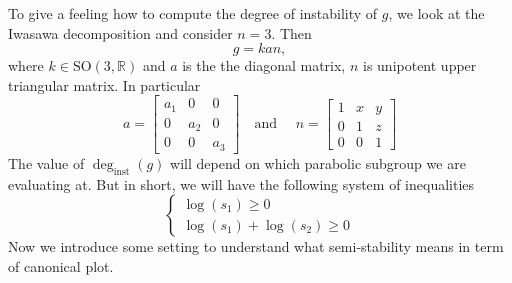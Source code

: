 \documentclass[12pt]{article} %
\begin{document}
    To give a feeling how to compute the degree of instability of $g$, we look at the Iwasawa decomposition and consider $n=3$.
    Then 
    \[g = kan,\]
    where $k \in \text{SO}(3,\mathbb{R})$ and $a$ is the the diagonal matrix, $n$ is unipotent upper triangular matrix. In particular
    \[a = \begin{bmatrix}
        a_1 & 0 & 0\\
        0 & a_2 & 0\\
        0 & 0 & a_3
    \end{bmatrix}\quad \text{and }\quad n =\begin{bmatrix}
        1 & x & y\\
        0 & 1 & z\\
        0 & 0 & 1
    \end{bmatrix} \]
    The value of $\deg_{\text{inst}}(g)$ will depend on which parabolic subgroup we are evaluating at. But in short, we will have 
    the following system of inequalities
    \[\begin{cases}
        \log(s_1) \ge 0 \\
        \log(s_1)+\log(s_2) \ge 0
    \end{cases}\]
    Now we introduce some setting to understand what semi-stability means in term of canonical plot.
    
\end{document}
